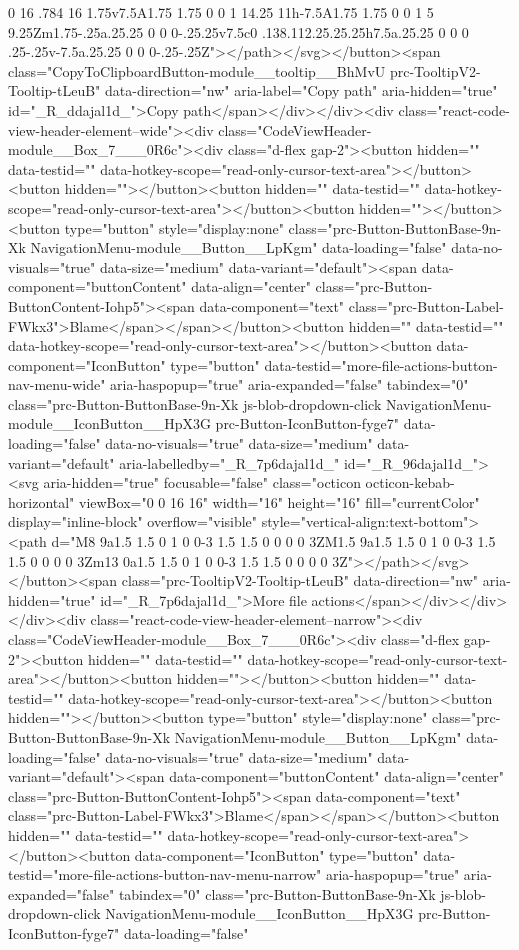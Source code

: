 {{{{{{{0 16 .784 16 1.75v7.5A1.75 1.75 0 0 1 14.25 11h-7.5A1.75 1.75 0 0 1 5 9.25Zm1.75-.25a.25.25 0 0 0-.25.25v7.5c0 .138.112.25.25.25h7.5a.25.25 0 0 0 .25-.25v-7.5a.25.25 0 0 0-.25-.25Z"></path></svg></button><span class="CopyToClipboardButton-module__tooltip__BhMvU prc-TooltipV2-Tooltip-tLeuB" data-direction="nw" aria-label="Copy path" aria-hidden="true" id="_R_ddajal1d_">Copy path</span></div></div><div class="react-code-view-header-element--wide"><div class="CodeViewHeader-module__Box_7___0R6c"><div class="d-flex gap-2"><button hidden="" data-testid="" data-hotkey-scope="read-only-cursor-text-area"></button><button hidden=""></button><button hidden="" data-testid="" data-hotkey-scope="read-only-cursor-text-area"></button><button hidden=""></button><button type="button" style="display:none" class="prc-Button-ButtonBase-9n-Xk NavigationMenu-module__Button__LpKgm" data-loading="false" data-no-visuals="true" data-size="medium" data-variant="default"><span data-component="buttonContent" data-align="center" class="prc-Button-ButtonContent-Iohp5"><span data-component="text" class="prc-Button-Label-FWkx3">Blame</span></span></button><button hidden="" data-testid="" data-hotkey-scope="read-only-cursor-text-area"></button><button data-component="IconButton" type="button" data-testid="more-file-actions-button-nav-menu-wide" aria-haspopup="true" aria-expanded="false" tabindex="0" class="prc-Button-ButtonBase-9n-Xk js-blob-dropdown-click NavigationMenu-module__IconButton__HpX3G prc-Button-IconButton-fyge7" data-loading="false" data-no-visuals="true" data-size="medium" data-variant="default" aria-labelledby="_R_7p6dajal1d_" id="_R_96dajal1d_"><svg aria-hidden="true" focusable="false" class="octicon octicon-kebab-horizontal" viewBox="0 0 16 16" width="16" height="16" fill="currentColor" display="inline-block" overflow="visible" style="vertical-align:text-bottom"><path d="M8 9a1.5 1.5 0 1 0 0-3 1.5 1.5 0 0 0 0 3ZM1.5 9a1.5 1.5 0 1 0 0-3 1.5 1.5 0 0 0 0 3Zm13 0a1.5 1.5 0 1 0 0-3 1.5 1.5 0 0 0 0 3Z"></path></svg></button><span class="prc-TooltipV2-Tooltip-tLeuB" data-direction="nw" aria-hidden="true" id="_R_7p6dajal1d_">More file actions</span></div></div></div><div class="react-code-view-header-element--narrow"><div class="CodeViewHeader-module__Box_7___0R6c"><div class="d-flex gap-2"><button hidden="" data-testid="" data-hotkey-scope="read-only-cursor-text-area"></button><button hidden=""></button><button hidden="" data-testid="" data-hotkey-scope="read-only-cursor-text-area"></button><button hidden=""></button><button type="button" style="display:none" class="prc-Button-ButtonBase-9n-Xk NavigationMenu-module__Button__LpKgm" data-loading="false" data-no-visuals="true" data-size="medium" data-variant="default"><span data-component="buttonContent" data-align="center" class="prc-Button-ButtonContent-Iohp5"><span data-component="text" class="prc-Button-Label-FWkx3">Blame</span></span></button><button hidden="" data-testid="" data-hotkey-scope="read-only-cursor-text-area"></button><button data-component="IconButton" type="button" data-testid="more-file-actions-button-nav-menu-narrow" aria-haspopup="true" aria-expanded="false" tabindex="0" class="prc-Button-ButtonBase-9n-Xk js-blob-dropdown-click NavigationMenu-module__IconButton__HpX3G prc-Button-IconButton-fyge7" data-loading="false" }}}}}}}
